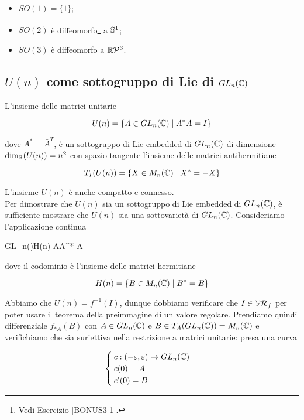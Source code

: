 \begin{itemize}
	\item $ SO(1) = \{ 1 \} $;
	
	\item $ SO(2) $ è diffeomorfo\footnote{%
		Vedi Esercizio \ref{BONUS3-1}.%
	} a $ \S^{1} $;
	
	\item $ SO(3) $ è diffeomorfo a $ \rp{3} $.
\end{itemize}

\subsection{$ U(n) $ come sottogruppo di Lie di $ GL_{n}(\C) $}

L'insieme delle matrici unitarie

\begin{equation}
	U(n) = \{ A \in GL_{n}(\C) \mid A^{*} A = I \}
\end{equation}

dove $ A^{*} = \bar{A}^{T} $, è un sottogruppo di Lie embedded di $ GL_{n}(\C) $ di dimensione $ \dim_{\R}(U(n)) = n^{2} $ con spazio tangente l'insieme delle matrici antihermitiane

\begin{equation}
	T_{I}(U(n)) = \{ X \in M_{n}(\C) \mid X^{*} = -X \}
\end{equation}

L'insieme $ U(n) $ è anche compatto e connesso.\\
Per dimostrare che $ U(n) $ sia un sottogruppo di Lie embedded di $ GL_{n}(\C) $, è sufficiente mostrare che $ U(n) $ sia una sottovarietà di $ GL_{n}(\C) $. Consideriamo l'applicazione continua

	{GL_{n}(\C)}{H(n)}
	{A}{A^{*} A}

dove il codominio è l'insieme delle matrici hermitiane

\begin{equation}
	H(n) = \{ B \in M_{n}(\C) \mid B^{*} = B \}
\end{equation}

Abbiamo che $ U(n) = f^{-1}(I) $, dunque dobbiamo verificare che $ I \in \VR_{f} $ per poter usare il teorema della preimmagine di un valore regolare. Prendiamo quindi differenziale $ f_{*A}(B) $ con $ A \in GL_{n}(\C) $ e $ B \in T_{A}(GL_{n}(\C)) = M_{n}(\C) $ e verifichiamo che sia suriettiva nella restrizione a matrici unitarie: presa una curva

\begin{equation}
	\begin{cases}
		c : (-\varepsilon,\varepsilon) \to GL_{n}(\C) \\
		c(0) = A \\
		c'(0) = B
	\end{cases}
\end{equation}

